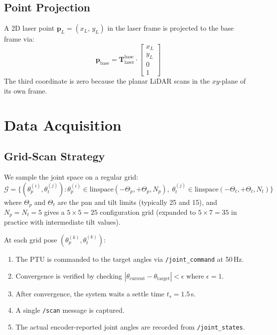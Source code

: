 \documentclass[12pt,a4paper]{article}
\newcommand{\T}{\mathbf{T}}
\newcommand{\pvec}{\mathbf{p}}
\newcommand{\code}[1]{\texttt{#1}}
\begin{document}
\subsection{Point Projection}

A 2D laser point $\pvec_L = (x_L,\, y_L)$ in the laser frame
is projected to the base frame via:
\begin{equation}
    \pvec_{\text{base}} = \T_{\text{laser}}^{\text{base}} \cdot
    \begin{bmatrix} x_L \\ y_L \\ 0 \\ 1 \end{bmatrix}
    \label{eq:point_projection}
\end{equation}
The third coordinate is zero because the planar LiDAR scans in the $xy$-plane
of its own frame.


\section{Data Acquisition}
\label{sec:acquisition}

\subsection{Grid-Scan Strategy}

We sample the joint space on a regular grid:
\begin{equation}
    \mathcal{G} = \bigl\{(\theta_p^{(i)}, \theta_t^{(j)}) :
    \theta_p^{(i)} \in \text{linspace}(-\Theta_p, +\Theta_p, N_p),\;
    \theta_t^{(j)} \in \text{linspace}(-\Theta_t, +\Theta_t, N_t)\bigr\}
    \label{eq:grid}
\end{equation}
where $\Theta_p$ and $\Theta_t$ are the pan and tilt limits (typically 25\textdegree{}
and 15\textdegree{}), and $N_p = N_t = 5$ gives a $5 \times 5 = 25$
configuration grid (expanded to $5 \times 7 = 35$ in practice with
intermediate tilt values).

At each grid pose $(\theta_p^{(k)}, \theta_t^{(k)})$:
\begin{enumerate}[nosep]
    \item The PTU is commanded to the target angles via
          \code{/joint\_command} at 50\,Hz.
    \item Convergence is verified by checking
          $|\theta_{\text{current}} - \theta_{\text{target}}| < \epsilon$
          where $\epsilon = 1$\textdegree.
    \item After convergence, the system waits a settle time $t_s = 1.5$\,s.
    \item A single \code{/scan} message is captured.
    \item The actual encoder-reported joint angles are recorded from
          \code{/joint\_states}.
\end{enumerate}
\end{document}
